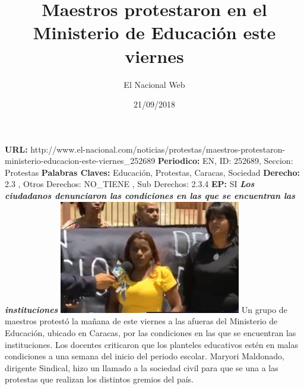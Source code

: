 \documentclass{article}%
\title{\textbf{Maestros protestaron en el Ministerio de Educación este viernes}}%
\author{El Nacional Web}%
\date{21/09/2018}%
\begin{document}
%
\normalsize%
\maketitle%
\textbf{URL: }%
http://www.el{-}nacional.com/noticias/protestas/maestros{-}protestaron{-}ministerio{-}educacion{-}este{-}viernes\_252689\newline%
%
\textbf{Periodico: }%
EN, %
ID: %
252689, %
Seccion: %
Protestas\newline%
%
\textbf{Palabras Claves: }%
Educación, Protestas, Caracas, Sociedad\newline%
%
\textbf{Derecho: }%
2.3%
, Otros Derechos: %
NO\_TIENE%
, Sub Derechos: %
2.3.4%
\newline%
%
\textbf{EP: }%
SI\newline%
\newline%
%
\textbf{\textit{Los ciudadanos denunciaron las condiciones en las que se encuentran las instituciones}}%
\newline%
\newline%
%
\includegraphics[width=300px]{87.jpg}%
\newline%
%
Un grupo de maestros protestó la mañana de este viernes a las afueras del Ministerio de Educación, ubicado en Caracas, por las condiciones en las que se encuentran las instituciones.%
\newline%
%
Los docentes criticaron que los planteles educativos estén en malas condiciones a una semana del inicio del periodo escolar.%
\newline%
%
Maryori Maldonado, dirigente Sindical, hizo un llamado a la sociedad civil para que se una a las protestas que realizan los distintos gremios del país.%
\newline%
%
\end{document}
